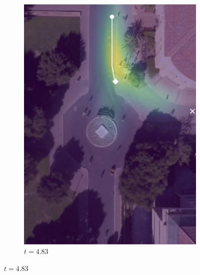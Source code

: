 \documentclass[conference]{IEEEtran}
\begin{document}
\begin{figure}
\begin{subfigure}[b]{.45\linewidth}
			\includegraphics[width=\linewidth]{./figures/FirstPage/gates_1_2_t=145.png}
			\caption{$t=4.83$}
		\end{subfigure}
	

\end{figure}
\end{document}
